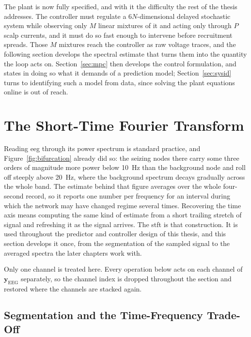 The plant is now fully specified, and with it the difficulty the rest of the thesis
addresses. The controller must regulate a $6N$-dimensional delayed stochastic system while
observing only $M$ linear mixtures of it and acting only through $P$ scalp currents, and it
must do so fast enough to intervene before recruitment spreads. Those $M$ mixtures reach the
controller as raw voltage traces, and the following section develops the spectral estimate
that turns them into the quantity the loop acts on. Section~\ref{sec:mpc} then develops the control formulation, and states in
doing so what it demands of a prediction model; Section~\ref{sec:sysid} turns to identifying
such a model from data, since solving the plant equations online is out of reach.

\section{The Short-Time Fourier Transform}
\label{sec:stft}

Reading \ac{eeg} through its power spectrum is standard practice, and
Figure~\ref{fig:bifurcation} already did so: the seizing nodes there carry some three orders of
magnitude more power below \SI{10}{\hertz} than the background node and roll off steeply above
\SI{20}{\hertz}, where the background spectrum decays gradually across the whole band. The
estimate behind that figure averages over the whole four-second record, so it reports one
number per frequency for an interval during which the network may have changed regime several
times. Recovering the time axis means computing the same kind of estimate from a short
trailing stretch of signal and refreshing it as the signal arrives. The \ac{stft} is that
construction. It is used throughout the predictor and controller design of this thesis, and
this section develops it once, from the segmentation of the sampled signal to the averaged
spectra the later chapters work with.

Only one channel is treated here. Every operation below acts on each channel of
$\mathbf{y}_\mathrm{EEG}$ separately, so the channel index is dropped throughout the section
and restored where the channels are stacked again.

\subsection{Segmentation and the Time-Frequency Trade-Off}
\label{sec:stft_grid}


